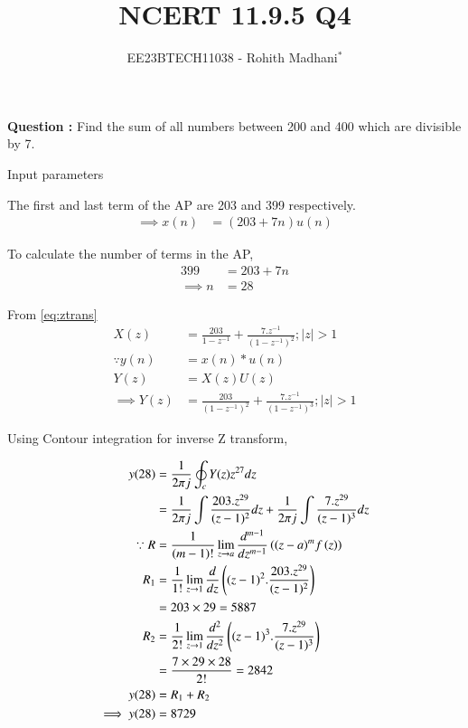 \documentclass[journal,12pt,twocolumn]{IEEEtran}
\theoremstyle{remark}
\begin{document}

\vspace{3cm}

\title{NCERT 11.9.5 Q4}
\author{EE23BTECH11038 - Rohith Madhani$^{*}$%
}
\maketitle
\newpage
\bigskip
\renewcommand{\thefigure}{\theenumi}
\renewcommand{\thetable}{\theenumi}

\textbf{Question :} Find the sum of all numbers between 200 and 400 which are divisible by 7.\\
\solution 

\begin{table}[!h] 
\centering

\caption{Input parameters}
\label{table:11.9.5.4}
\end{table}

The first and last term of the AP are 203 and 399 respectively.
\begin{align}
    \implies x(n) &= (203 + 7n)u(n) 
\end{align}

To calculate the number of terms in the AP,
\begin{align}
    399 &= 203 + 7n \\
    \implies n &= 28
\end{align}

From \eqref{eq:ztrans}
\begin{align}
    X(z) &= \frac{203}{1-z^{-1}} + \frac{7.z^{-1}}{(1-z^{-1})^2} ; |z|>1 \\
    \because y(n) &= x(n)*u(n) \\
    Y(z) &= X(z)U(z) \\
    \implies Y(z) &= \frac{203}{(1-z^{-1})^2} + \frac{7.z^{-1}}{(1-z^{-1})^3} ; |z|>1 
\end{align}

Using Contour integration for inverse Z transform,

\begin{align}
    y(28) &= \frac{1}{2\pi j}\oint_c Y(z) z^{27} dz \\
    &= \frac{1}{2\pi j}\int \frac{203.z^{29}}{(z-1)^{2}} dz + \frac{1}{2\pi j}\int \frac{7.z^{29}}{(z-1)^{3}} dz\\
    \because R&=\frac{1}{\left(m-1\right)!}\lim\limits_{z\to a}\frac{d^{m-1}}{dz^{m-1}}\left({(z-a)}^{m}f\left(z\right)\right)\\
    R_1 &=\frac{1}{1!}\lim\limits_{z\to 1}\frac{d}{dz}\left((z-1)^2.\frac{203.z^{29}}{(z-1)^{2}}\right)\\
    &= 203 \times 29 = 5887 \\
    R_2 &=\frac{1}{2!}\lim\limits_{z\to 1}\frac{d^2}{dz^2}\left((z-1)^3.\frac{7.z^{29}}{(z-1)^{3}}\right)\\
    &= \frac{7 \times 29 \times 28}{2!} = 2842\\
    y(28) &= R_1 + R_2 \\
    \implies y(28) &= 8729 
\end{align}
\end{document}
